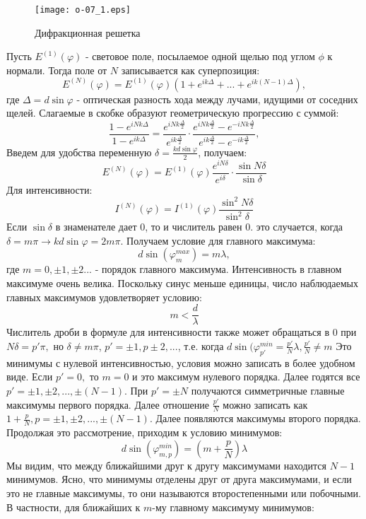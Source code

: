 \documentclass[__main__.tex]{subfiles}
\begin{document}
\begin{figure}[h]
	\begin{center}
		\texttt{[image: o-07\_1.eps]}
		\caption{Дифракционная решетка}
	\end{center}
\end{figure}

Пусть $E^{(1)} (\varphi)$ - световое поле, посылаемое одной щелью под углом $\phi$ к нормали. Тогда поле от $N$ записывается как суперпозиция:
$$E^{(N)}(\varphi) = E^{(1)}(\varphi)(1 + e^{ik\Delta} + ... + e^{ik(N-1)\Delta}),$$
где $\Delta = d\sin \varphi$ - оптическая разность хода между лучами, идущими от соседних щелей. Слагаемые в скобке образуют геометрическую прогрессию с суммой:
$$\frac{1-e^{iNk\Delta}}{1-e^{ik\Delta}} = \frac{e^{iNk\frac{\Delta}{2}}}{e^{ik\frac{\Delta}{2}}}\cdot \frac{e^{iNk\frac{\Delta}{2}} - e^{-iNk\frac{\Delta}{2}}}{e^{ik\frac{\Delta}{2}} - e^{-ik\frac{\Delta}{2}}},$$
Введем для удобства переменную $\delta = \frac{kd\sin\varphi}{2}$, получаем:
$$E^{(N)}(\varphi) = E^{(1)}(\varphi)\frac{e^{iN\delta}}{e^{i\delta}}\cdot \frac{\sin N\delta}{\sin\delta}$$
Для интенсивности:
$$I^{(N)}(\varphi) = I^{(1)}(\varphi)\frac{\sin^2 N\delta}{\sin^2\delta}$$
Если $\sin \delta$ в знаменателе дает 0, то и числитель равен 0. это случается, когда $\delta = m\pi \rightarrow kd\sin\varphi = 2m\pi$. Получаем условие для главного максимума:
$$d\sin(\varphi^{max}_m) = m\lambda,$$
где $m = 0, \pm 1, \pm 2...$ - порядок главного максимума. Интенсивность в главном максимуме очень велика. Поскольку синус меньше единицы, число наблюдаемых главных максимумов удовлетворяет условию:
$$m < \frac{d}{\lambda}$$
Числитель дроби в формуле для интенсивности также может обращаться в 0 при $N\delta = p'\pi, $ но $\delta \neq m\pi$, $p' = \pm 1, p\pm 2, ...$, т.е. когда $d\sin(\varphi ^{min}_{p'} = \frac{p'}{N}\lambda, \frac{p'}{N} \neq m$  
Это минимумы с нулевой интенсивностью, условия можно записать в более удобном виде. Если $p' = 0, $ то $m = 0$ и это максимум нулевого порядка. Далее годятся все $p' = \pm1, \pm2, ... , \pm(N-1). $ При $p' = \pm N$ получаются симметричные главные максимумы первого порядка. Далее отношение $\frac{p'}{N}$ можно записать как $1 + \frac{p}{N}, p =  \pm1, \pm2, ... , \pm(N-1)$. Далее появляются максимумы второго порядка. Продолжая это рассмотрение, приходим к условию минимумов:
$$d \sin(\varphi^{min}_{m, p}) = (m + \frac{p}{N})\lambda$$
Мы видим, что между ближайшими друг к другу максимумами находится $N - 1$ минимумов. Ясно, что минимумы отделены друг от друга максимумами, и если это не главные максимумы, то они называются второстепенными или побочными. В частности, для ближайших к $m$-му главному максимуму минимумов:
\end{document}
